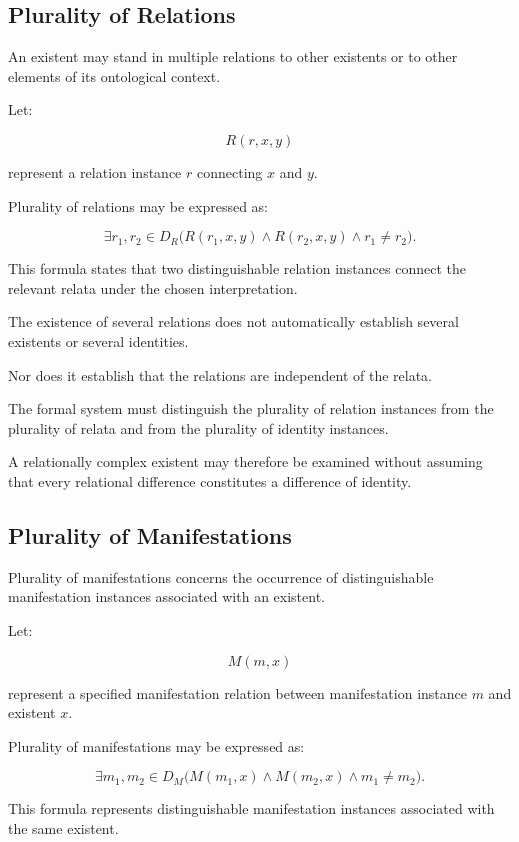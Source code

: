 \subsection{Plurality of Relations}

An existent may stand in multiple
relations to other existents or to
other elements of its ontological
context.

Let:

\[
    R(r,x,y)
\]

represent a relation instance \(r\)
connecting \(x\) and \(y\).

Plurality of relations may be expressed
as:

\[
    \exists r_1,r_2 \in D_R
    \bigl(
        R(r_1,x,y)
        \land
        R(r_2,x,y)
        \land
        r_1 \neq r_2
    \bigr).
\]

This formula states that two
distinguishable relation instances
connect the relevant relata under
the chosen interpretation.

The existence of several relations
does not automatically establish
several existents or several identities.

Nor does it establish that the
relations are independent of the
relata.

The formal system must distinguish
the plurality of relation instances
from the plurality of relata and
from the plurality of identity
instances.

A relationally complex existent
may therefore be examined without
assuming that every relational
difference constitutes a difference
of identity.

\subsection{Plurality of Manifestations}

Plurality of manifestations concerns
the occurrence of distinguishable
manifestation instances associated
with an existent.

Let:

\[
    M(m,x)
\]

represent a specified manifestation
relation between manifestation instance
\(m\) and existent \(x\).

Plurality of manifestations may be
expressed as:

\[
    \exists m_1,m_2 \in D_M
    \bigl(
        M(m_1,x)
        \land
        M(m_2,x)
        \land
        m_1 \neq m_2
    \bigr).
\]

This formula represents distinguishable
manifestation instances associated
with the same existent.

